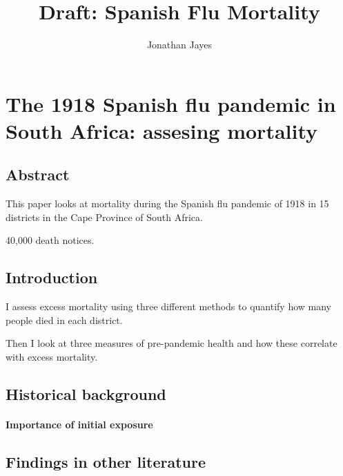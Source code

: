 \documentclass[fleqn,10pt,lineno]{wlpeerj} %
\title{Draft: Spanish Flu Mortality}
\author[]{Jonathan Jayes}
\begin{document}
\flushbottom
\maketitle
\thispagestyle{empty}

\hypertarget{the-1918-spanish-flu-pandemic-in-south-africa-assesing-mortality}{%
\section{The 1918 Spanish flu pandemic in South Africa: assesing mortality}\label{the-1918-spanish-flu-pandemic-in-south-africa-assesing-mortality}}

\hypertarget{abstract}{%
\subsection{Abstract}\label{abstract}}

This paper looks at mortality during the Spanish flu pandemic of 1918 in 15 districts in the Cape Province of South Africa.

40,000 death notices.

\hypertarget{introduction}{%
\subsection{Introduction}\label{introduction}}

I assess excess mortality using three different methods to quantify how many people died in each district.

Then I look at three measures of pre-pandemic health and how these correlate with excess mortality.

\hypertarget{historical-background}{%
\subsection{Historical background}\label{historical-background}}

\hypertarget{importance-of-initial-exposure}{%
\paragraph{Importance of initial exposure}\label{importance-of-initial-exposure}}

\hypertarget{findings-in-other-literature}{%
\subsection{Findings in other literature}\label{findings-in-other-literature}}
\end{document}
